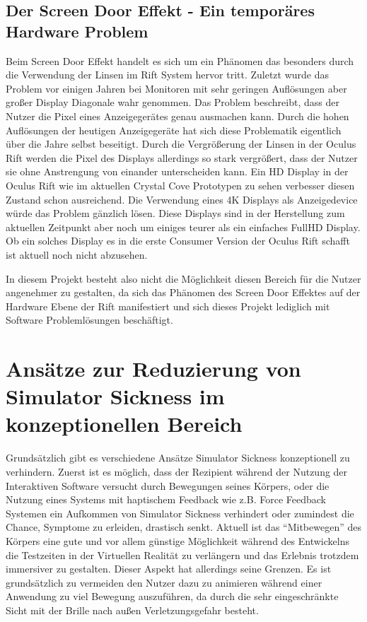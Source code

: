 \documentclass[pagesize, paper=a4, fontsize=12pt,titlepage=true, headings=small, headnosepline, abstractoff, liststotoc, nochapterprefix, plainheadsepline]{scrreprt}
\begin{document}
\subsection{Der Screen Door Effekt - Ein temporäres Hardware Problem}
Beim Screen Door Effekt handelt es sich um ein Phänomen das besonders durch die Verwendung der Linsen im Rift System hervor tritt. Zuletzt wurde das Problem vor einigen Jahren bei Monitoren mit sehr geringen Auflösungen aber großer Display Diagonale wahr genommen. Das Problem beschreibt, dass der Nutzer die Pixel eines Anzeigegerätes genau ausmachen kann. Durch die hohen Auflösungen der heutigen Anzeigegeräte hat sich diese Problematik eigentlich über die Jahre selbst beseitigt. Durch die Vergrößerung der Linsen in der Oculus Rift werden die Pixel des Displays allerdings so stark vergrößert, dass der Nutzer sie ohne Anstrengung von einander unterscheiden kann. Ein HD Display in der Oculus Rift wie im aktuellen Crystal Cove Prototypen zu sehen verbesser diesen Zustand schon ausreichend. Die Verwendung eines 4K Displays als Anzeigedevice würde das Problem gänzlich lösen. Diese Displays sind in der Herstellung zum aktuellen Zeitpunkt aber noch um einiges teurer als ein einfaches FullHD Display. Ob ein solches Display es in die erste Consumer Version der Oculus Rift schafft ist aktuell noch nicht abzusehen. 

In diesem Projekt besteht also nicht die Möglichkeit diesen Bereich für die Nutzer angenehmer zu gestalten, da sich das Phänomen des Screen Door Effektes auf der Hardware Ebene der Rift manifestiert und sich dieses Projekt lediglich mit Software Problemlösungen beschäftigt.

\section{Ansätze zur Reduzierung von Simulator Sickness im konzeptionellen Bereich}
Grundsätzlich gibt es verschiedene Ansätze Simulator Sickness konzeptionell zu verhindern. Zuerst ist es möglich, dass der Rezipient während der Nutzung der Interaktiven Software versucht durch Bewegungen seines Körpers, oder die Nutzung eines Systems mit haptischem Feedback wie z.B. Force Feedback Systemen ein Aufkommen von Simulator Sickness verhindert oder zumindest die Chance, Symptome zu erleiden, drastisch senkt. Aktuell ist das "`Mitbewegen"' des Körpers eine gute und vor allem günstige Möglichkeit während des Entwickelns die Testzeiten in der Virtuellen Realität zu verlängern und das Erlebnis trotzdem immersiver zu gestalten. Dieser Aspekt hat allerdings seine Grenzen. Es ist grundsätzlich zu vermeiden den Nutzer dazu zu animieren während einer Anwendung zu viel Bewegung auszuführen, da durch die sehr eingeschränkte Sicht mit der Brille nach außen Verletzungsgefahr besteht.
\end{document}
